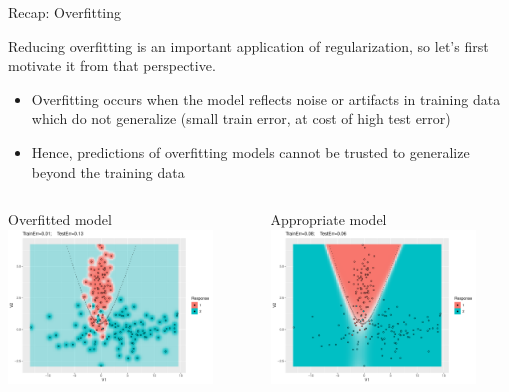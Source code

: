 \documentclass[11pt,compress,t,notes=noshow, xcolor=table]{beamer}
\begin{document}
\begin{vbframe}{Recap: Overfitting}

Reducing overfitting is an important application of regularization, so let's first motivate it from that perspective.

\begin{itemize}
  \item Overfitting occurs when the model reflects noise or artifacts in training data which do not generalize (small train error, at cost of high test error)
  \item Hence, predictions of overfitting models cannot be trusted to generalize beyond the training data
\end{itemize}
\lz
\begin{columns}
\begin{column}{0.5\textwidth}
  \raggedright
  Overfitted model\\
  \includegraphics[width=0.85\textwidth]{figure/eval_ofit_1o}
\end{column}
\begin{column}{0.5\textwidth}
  \raggedright
    Appropriate model\\
  \includegraphics[width=0.85\textwidth]{figure/eval_ofit_1a}
\end{column}
\end{columns}
    
\end{vbframe}
\end{document}
